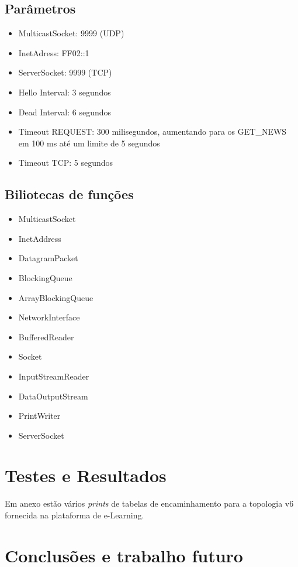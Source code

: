 \documentclass{llncs}
\begin{document}
\subsection{Parâmetros}

\begin{itemize}
    \item MulticastSocket: 9999 (UDP)
    \item InetAdress: FF02::1
    \item ServerSocket: 9999 (TCP)
    \item Hello Interval: 3 segundos
    \item Dead Interval: 6 segundos
    \item Timeout REQUEST: 300 milisegundos, aumentando para os GET\_NEWS em 100 ms até um limite de 5 segundos
    \item Timeout TCP: 5 segundos
\end{itemize}

\subsection{Biliotecas de funções}

\begin{itemize}
    \item MulticastSocket
    \item InetAddress
    \item DatagramPacket
    \item BlockingQueue
    \item ArrayBlockingQueue
    \item NetworkInterface
    \item BufferedReader
    \item Socket
    \item InputStreamReader
    \item DataOutputStream
    \item PrintWriter
    \item ServerSocket
\end{itemize}

\section{Testes e Resultados}

Em anexo estão vários \emph{prints} de tabelas de encaminhamento para a topologia v6 fornecida na plataforma de e-Learning.

\section{Conclusões e trabalho futuro}
\end{document}
